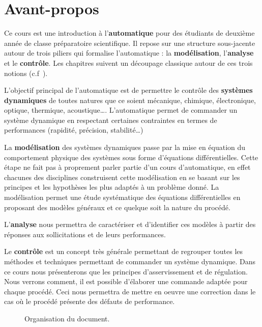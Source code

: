 \chapter*{Avant-propos}

Ce cours est une introduction à l'\textbf{automatique}
pour des étudiants de deuxième année de classe préparatoire scientifique.
Il repose sur une structure sous-jacente autour de 
trois piliers qui formalise l'automatique : la \textbf{modélisation}, l'\textbf{analyse} et 
le \textbf{contrôle}. Les chapitres suivent un découpage classique
autour de ces trois notions (c.f~).

L'objectif principal de l'automatique est de permettre
le contrôle des \textbf{systèmes dynamiques}
de toutes natures que ce soient mécanique, chimique, 
électronique, optique, thermique, acoustique\ldots.
L'automatique permet de commander un système dynamique en respectant
certaines contraintes en termes de performances (rapidité, précision, stabilité\ldots)

La \textbf{modélisation} des systèmes dynamiques passe par 
la mise en équation du comportement physique des
systèmes sous forme d'équations différentielles.
Cette étape ne fait pas à proprement parler partie d'un cours d'automatique,
en effet chacunes des disciplines construisent cette modélisation 
en se basant sur les principes et les hypothèses les plus adaptés 
à un problème donné.
La modélisation permet une étude systématique des équations
différentielles en proposant des modèles généraux 
et ce quelque soit la nature du procédé.

L'\textbf{analyse} nous permettra de caractériser et d'identifier 
ces modèles à partir des réponses aux sollicitations et de leurs performances.

Le \textbf{contrôle} est un concept très générale permettant de regrouper
toutes les méthodes et techniques permettant de commander un système dynamique.
Dans ce cours nous présenterons que les principes d'asservissement et de régulation.
Nous verrons comment, il est possible d'élaborer une commande adaptée pour chaque
procédé. Ceci nous permettra de mettre en oeuvre
une correction dans le cas où le procédé présente des défauts de performance.


\begin{figure}[!h]
\renewcommand\thefigure{A}
\begin{center}
{
\tikzset{external/export=false}

}
\end{center}
\caption{Organisation du document.\label{fig-diagramme_cours}}
\end{figure}
